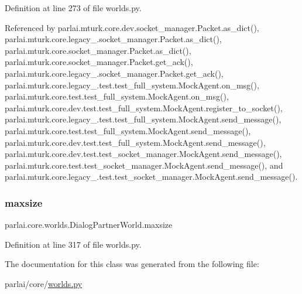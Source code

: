 Definition at line 273 of file worlds.\+py.



Referenced by parlai.\+mturk.\+core.\+dev.\+socket\+\_\+manager.\+Packet.\+as\+\_\+dict(), parlai.\+mturk.\+core.\+legacy\+\_.\+socket\+\_\+manager.\+Packet.\+as\+\_\+dict(), parlai.\+mturk.\+core.\+socket\+\_\+manager.\+Packet.\+as\+\_\+dict(), parlai.\+mturk.\+core.\+socket\+\_\+manager.\+Packet.\+get\+\_\+ack(), parlai.\+mturk.\+core.\+legacy\+\_.\+socket\+\_\+manager.\+Packet.\+get\+\_\+ack(), parlai.\+mturk.\+core.\+legacy\+\_.\+test.\+test\+\_\+full\+\_\+system.\+Mock\+Agent.\+on\+\_\+msg(), parlai.\+mturk.\+core.\+test.\+test\+\_\+full\+\_\+system.\+Mock\+Agent.\+on\+\_\+msg(), parlai.\+mturk.\+core.\+dev.\+test.\+test\+\_\+full\+\_\+system.\+Mock\+Agent.\+register\+\_\+to\+\_\+socket(), parlai.\+mturk.\+core.\+legacy\+\_.\+test.\+test\+\_\+full\+\_\+system.\+Mock\+Agent.\+send\+\_\+message(), parlai.\+mturk.\+core.\+test.\+test\+\_\+full\+\_\+system.\+Mock\+Agent.\+send\+\_\+message(), parlai.\+mturk.\+core.\+dev.\+test.\+test\+\_\+full\+\_\+system.\+Mock\+Agent.\+send\+\_\+message(), parlai.\+mturk.\+core.\+dev.\+test.\+test\+\_\+socket\+\_\+manager.\+Mock\+Agent.\+send\+\_\+message(), parlai.\+mturk.\+core.\+test.\+test\+\_\+socket\+\_\+manager.\+Mock\+Agent.\+send\+\_\+message(), and parlai.\+mturk.\+core.\+legacy\+\_.\+test.\+test\+\_\+socket\+\_\+manager.\+Mock\+Agent.\+send\+\_\+message().

\mbox{\label{classparlai_1_1core_1_1worlds_1_1DialogPartnerWorld_acae28d33fb7d494b7df84d0f8c57eb23}} 
\subsubsection{\texorpdfstring{maxsize}{maxsize}}
{\footnotesize\ttfamily parlai.\+core.\+worlds.\+Dialog\+Partner\+World.\+maxsize\hspace{0.3cm}{\ttfamily [static]}}



Definition at line 317 of file worlds.\+py.



The documentation for this class was generated from the following file\+:\begin{DoxyCompactItemize}
\item 
parlai/core/\hyperlink{parlai_2core_2worlds_8py}{worlds.\+py}\end{DoxyCompactItemize}

